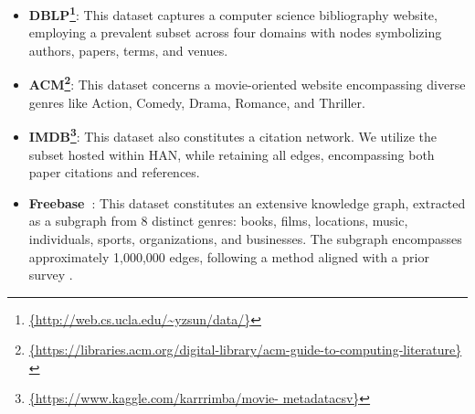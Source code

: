 \begin{itemize}[leftmargin=*] 
    \item {\bf DBLP\footnote{\url{{http://web.cs.ucla.edu/~yzsun/data/}}}}: This dataset captures a computer science bibliography website, employing a prevalent subset across four domains with nodes symbolizing authors, papers, terms, and venues.
    \item {\bf ACM\footnote{\url{{https://libraries.acm.org/digital-library/acm-guide-to-computing-literature}}}}: This dataset concerns a movie-oriented website encompassing diverse genres like Action, Comedy, Drama, Romance, and Thriller.
    \item {\bf IMDB\footnote{\url{{https://www.kaggle.com/karrrimba/movie- metadatacsv}}}}: 
    This dataset also constitutes a citation network. We utilize the subset hosted within HAN, while retaining all edges, encompassing both paper citations and references.
    \item {\bf Freebase~}\cite{bollacker2008freebase}: 
    This dataset constitutes an extensive knowledge graph, extracted as a subgraph from 8 distinct genres: books, films, locations, music, individuals, sports, organizations, and businesses. The subgraph encompasses approximately 1,000,000 edges, following a method aligned with a prior survey \cite{yang2020heterogeneous}.
\end{itemize}

